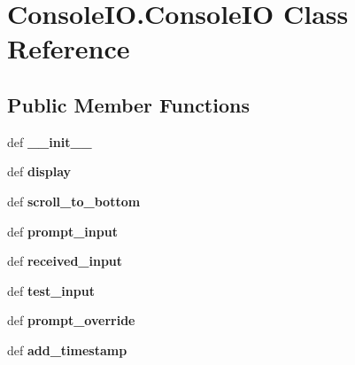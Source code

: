 \hypertarget{classConsoleIO_1_1ConsoleIO}{\section{Console\-I\-O.\-Console\-I\-O Class Reference}
\label{classConsoleIO_1_1ConsoleIO}
}
\subsection*{Public Member Functions}
\begin{DoxyCompactItemize}
\item 
\hypertarget{classConsoleIO_1_1ConsoleIO_ab6130ba6a6ea2fe9f4e5a7594a626638}{def {\bfseries \-\_\-\-\_\-init\-\_\-\-\_\-}}\label{classConsoleIO_1_1ConsoleIO_ab6130ba6a6ea2fe9f4e5a7594a626638}

\item 
\hypertarget{classConsoleIO_1_1ConsoleIO_a4e4b18df19846e1958a33406fcf983bc}{def {\bfseries display}}\label{classConsoleIO_1_1ConsoleIO_a4e4b18df19846e1958a33406fcf983bc}

\item 
\hypertarget{classConsoleIO_1_1ConsoleIO_aa48c2ade8c7c454f6ad20e78aa58b177}{def {\bfseries scroll\-\_\-to\-\_\-bottom}}\label{classConsoleIO_1_1ConsoleIO_aa48c2ade8c7c454f6ad20e78aa58b177}

\item 
\hypertarget{classConsoleIO_1_1ConsoleIO_a7cb2e29af6c33cd1aa2f22aba0d4d79b}{def {\bfseries prompt\-\_\-input}}\label{classConsoleIO_1_1ConsoleIO_a7cb2e29af6c33cd1aa2f22aba0d4d79b}

\item 
\hypertarget{classConsoleIO_1_1ConsoleIO_a013e864baa19f6ef66857611f2d861ba}{def {\bfseries received\-\_\-input}}\label{classConsoleIO_1_1ConsoleIO_a013e864baa19f6ef66857611f2d861ba}

\item 
\hypertarget{classConsoleIO_1_1ConsoleIO_ad5aa3ad0aa007cd65e58d9f96591893c}{def {\bfseries test\-\_\-input}}\label{classConsoleIO_1_1ConsoleIO_ad5aa3ad0aa007cd65e58d9f96591893c}

\item 
\hypertarget{classConsoleIO_1_1ConsoleIO_a574fc6a8582f7456a3938e2d64084c13}{def {\bfseries prompt\-\_\-override}}\label{classConsoleIO_1_1ConsoleIO_a574fc6a8582f7456a3938e2d64084c13}

\item 
\hypertarget{classConsoleIO_1_1ConsoleIO_ab72047f11562eb79c2c03189b76c9c72}{def {\bfseries add\-\_\-timestamp}}\label{classConsoleIO_1_1ConsoleIO_ab72047f11562eb79c2c03189b76c9c72}


\end{DoxyCompactItemize}

